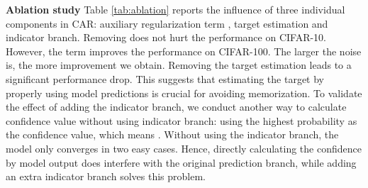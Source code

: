 \documentclass{article}
\begin{document}
\textbf{Ablation study} Table \ref{tab:ablation} reports the influence of three individual components in CAR: auxiliary regularization term , target estimation and indicator branch. Removing  does not hurt the performance on CIFAR-10. However, the term  improves the performance on CIFAR-100. The larger the noise is, the more improvement we obtain. Removing the target estimation leads to a significant performance drop. This suggests that estimating the target by properly using model predictions is crucial for avoiding memorization. To validate the effect of adding the indicator branch, we conduct another way to calculate confidence value without using indicator branch: using the highest probability as the confidence value, which means . Without using the indicator branch, the model only converges in two easy cases. Hence, directly calculating the confidence by model output does interfere with the original prediction branch, while adding an extra indicator branch solves this problem. 








\begin{table}
	\caption{Influence of three components in our approach.  means the model fails to converge.} \begin{center}
	\end{center}
	\label{tab:ablation}
\end{table}
\end{document}
